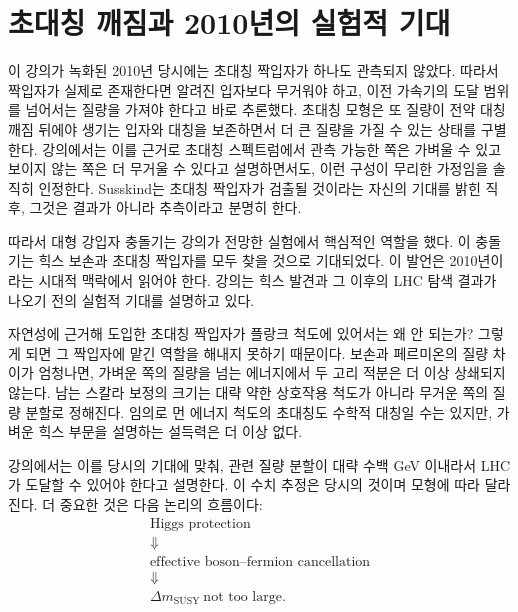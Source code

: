 \section{초대칭 깨짐과 2010년의 실험적 기대}

이 강의가 녹화된 2010년 당시에는 초대칭 짝입자가 하나도 관측되지 않았다. 따라서 짝입자가 실제로 존재한다면 알려진 입자보다 무거워야 하고, 이전 가속기의 도달 범위를 넘어서는 질량을 가져야 한다고 바로 추론했다. 초대칭 모형은 또 질량이 전약 대칭 깨짐 뒤에야 생기는 입자와 대칭을 보존하면서 더 큰 질량을 가질 수 있는 상태를 구별한다. 강의에서는 이를 근거로 초대칭 스펙트럼에서 관측 가능한 쪽은 가벼울 수 있고 보이지 않는 쪽은 더 무거울 수 있다고 설명하면서도, 이런 구성이 무리한 가정임을 솔직히 인정한다. Susskind는 초대칭 짝입자가 검출될 것이라는 자신의 기대를 밝힌 직후, 그것은 결과가 아니라 추측이라고 분명히 한다.

따라서 대형 강입자 충돌기는 강의가 전망한 실험에서 핵심적인 역할을 했다. 이 충돌기는 힉스 보손과 초대칭 짝입자를 모두 찾을 것으로 기대되었다. 이 발언은 2010년이라는 시대적 맥락에서 읽어야 한다. 강의는 힉스 발견과 그 이후의 LHC 탐색 결과가 나오기 전의 실험적 기대를 설명하고 있다.

자연성에 근거해 도입한 초대칭 짝입자가 플랑크 척도에 있어서는 왜 안 되는가? 그렇게 되면 그 짝입자에 맡긴 역할을 해내지 못하기 때문이다. 보손과 페르미온의 질량 차이가 엄청나면, 가벼운 쪽의 질량을 넘는 에너지에서 두 고리 적분은 더 이상 상쇄되지 않는다. 남는 스칼라 보정의 크기는 대략 약한 상호작용 척도가 아니라 무거운 쪽의 질량 분할로 정해진다. 임의로 먼 에너지 척도의 초대칭도 수학적 대칭일 수는 있지만, 가벼운 힉스 부문을 설명하는 설득력은 더 이상 없다.

강의에서는 이를 당시의 기대에 맞춰, 관련 질량 분할이 대략 수백 GeV 이내라서 LHC가 도달할 수 있어야 한다고 설명한다. 이 수치 추정은 당시의 것이며 모형에 따라 달라진다. 더 중요한 것은 다음 논리의 흐름이다:
\begin{equation}
\begin{gathered}
\text{Higgs protection}\\
\Downarrow\\
\text{effective boson--fermion cancellation}\\
\Downarrow\\
\Delta m_{\mathrm{SUSY}}\ \text{not too large}.
\end{gathered}
\end{equation}

\begin{classroomqa}\end{classroomqa}

